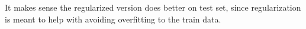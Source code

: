 \begin{answer}
It makes sense the regularized version does better on test set, since regularization is meant to help with avoiding overfitting to the train data.
\end{answer}
   
  
